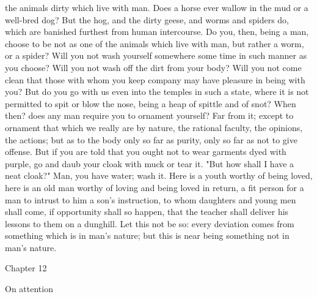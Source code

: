 \documentclass[a4paper]{article}
\begin{document}
the animals dirty which live with man. Does a horse ever wallow in the mud or a
well-bred dog? But the hog, and the dirty geese, and worms and spiders do,
which are banished furthest from human intercourse. Do you, then, being a man,
choose to be not as one of the animals which live with man, but rather a worm,
or a spider? Will you not wash yourself somewhere some time in such manner as
you choose? Will you not wash off the dirt from your body? Will you not come
clean that those with whom you keep company may have pleasure in being with
you? But do you go with us even into the temples in such a state, where it is
not permitted to spit or blow the nose, being a heap of spittle and of snot?
    When then? does any man require you to ornament yourself? Far from it;
except to ornament that which we really are by nature, the rational faculty,
the opinions, the actions; but as to the body only so far as purity, only so
far as not to give offense. But if you are told that you ought not to wear
garments dyed with purple, go and daub your cloak with muck or tear it. "But
how shall I have a neat cloak?" Man, you have water; wash it. Here is a youth
worthy of being loved, here is an old man worthy of loving and being loved in
return, a fit person for a man to intrust to him a son's instruction, to whom
daughters and young men shall come, if opportunity shall so happen, that the
teacher shall deliver his lessons to them on a dunghill. Let this not be so:
every deviation comes from something which is in man's nature; but this is near
being something not in man's nature.

Chapter 12

On attention
\end{document}
